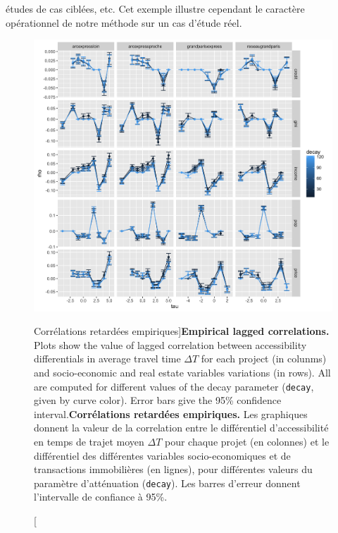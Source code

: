 {études de cas ciblées, etc. Cet exemple illustre cependant le caractère opérationnel de notre méthode sur un cas d'étude réel.
}


\begin{figure}[h!]
\includegraphics[width=\linewidth]{Figures/GrandParisRealEstate/laggedcorrs_times_allvars}
\caption[][Corrélations retardées empiriques]{\textbf{Empirical lagged correlations.} Plots show the value of lagged correlation between accessibility differentials in average travel time $\Delta T$ for each project (in colunms) and socio-economic and real estate variables variations (in rows). All are computed for different values of the decay parameter (\texttt{decay}, given by curve color). Error bars give the 95\% confidence interval.\label{fig:empiricalres}}{\textbf{Corrélations retardées empiriques.} Les graphiques donnent la valeur de la correlation entre le différentiel d'accessibilité en temps de trajet moyen $\Delta T$ pour chaque projet (en colonnes) et le différentiel des différentes variables socio-economiques et de transactions immobilières (en lignes), pour différentes valeurs du paramètre d'atténuation (\texttt{decay}). Les barres d'erreur donnent l'intervalle de confiance à 95\%.\label{fig:empiricalres}}
\end{figure}
















